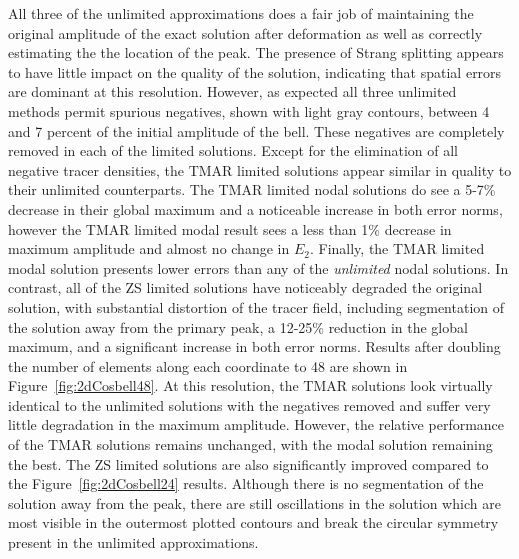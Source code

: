 \documentclass{ametsoc}
\begin{document}
All three of the unlimited approximations does a fair job of maintaining the original amplitude of the exact solution after deformation as well as correctly estimating the the location of the peak. The presence of Strang splitting appears to have little impact on the quality of the solution, indicating that spatial errors are dominant at this resolution. However, as expected all three unlimited methods permit spurious negatives, shown with light gray contours, between 4 and 7 percent of the initial amplitude of the bell. These negatives are completely removed in each of the limited solutions. Except for the elimination of all negative tracer densities, the TMAR limited solutions appear similar in quality to their unlimited counterparts. The TMAR limited nodal solutions do see a 5-7\% decrease in their global maximum and a noticeable increase in both error norms, however the TMAR limited modal result sees a less than 1\% decrease in maximum amplitude and almost no change in $E_2$. Finally, the TMAR limited modal solution presents lower errors than any of the {\it unlimited} nodal solutions. In contrast, all of the ZS limited solutions have noticeably degraded the original solution, with substantial distortion of the tracer field, including segmentation of the solution away from the primary peak, a 12-25\% reduction in the global maximum, and a significant increase in both error norms. Results after doubling the number of elements along each coordinate to 48 are shown in Figure~\ref{fig:2dCosbell48}. At this resolution, the TMAR solutions look virtually identical to the unlimited solutions with the negatives removed and suffer very little degradation in the maximum amplitude. However, the relative performance of the TMAR solutions remains unchanged, with the modal solution remaining the best. The ZS limited solutions are also significantly improved compared to the Figure~\ref{fig:2dCosbell24} results. Although there is no segmentation of the solution away from the peak, there are still oscillations in the solution which are most visible in the outermost plotted contours and break the circular symmetry present in the unlimited approximations.
\end{document}
